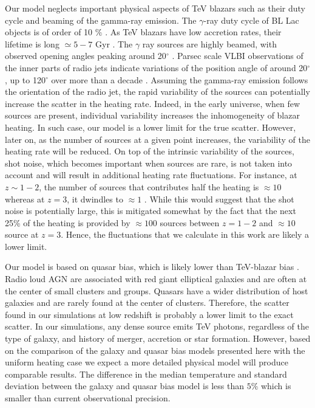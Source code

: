 \documentclass[numberedappendix]{emulateapj}
\newcommand\ALc[1]{{\color{red} \bf #1}} %
\begin{document}
{Our model neglects important physical aspects of TeV blazars such as their duty cycle and beaming of the gamma-ray emission. The $\gamma$-ray duty cycle of BL Lac objects is of order of 10 $\%$ \citep{1996ApJ...464..600S}. As TeV blazars have low accretion rates, their lifetime is long $\simeq 5-7$ Gyr \citep{2002ApJ...571..226C}. The $\gamma$ ray sources are highly beamed, with observed opening angles peaking around 20$^{\circ}$ \citep{2009A&A...507L..33P}. Parsec scale VLBI observations of the inner parts of radio jets indicate variations of the position angle of around 20$^{\circ}$, up to 120$^{\circ}$ over more than a decade \citep{2013AJ....146..120L}. Assuming the gamma-ray emission follows the orientation of the radio jet, the rapid variability of the sources can potentially increase the scatter in the heating rate. Indeed, in the early universe, when few sources are present,  individual variability increases the inhomogeneity of blazar heating. In such case, our model is a lower limit for the true scatter. However, later on, as the number of sources at a  given point increases, the variability of the heating rate will be reduced.    On top of the intrinsic  variability  of the sources, shot noise, which becomes important when sources are rare, is not taken into account and will result in additional heating rate fluctuations. For instance, at $z \sim 1-2$, the number of sources that contributes half the heating is $\approx 10$ whereas at $z = 3$, it dwindles to $\approx 1$ \citep{2012ApJ...752...23C}.   While this would suggest that the shot noise is potentially large, this is mitigated somewhat by the fact that the next 25\% of the heating is provided by $\approx 100$ sources between $z=1-2$ and $\approx 10$ source at $z=3$. 
Hence, the fluctuations that we calculate in this work are likely a lower limit.

Our model is based on quasar bias, which is likely lower than TeV-blazar bias \citep{2014arXiv1410.0358A}. Radio loud AGN are associated with red giant elliptical galaxies \citep{2007A&A...476..723H} and are often at the center of small clusters and groups. Quasars have a wider distribution of host galaxies and are rarely found at the center of clusters. Therefore, the scatter found in our simulations at low redshift is probably a lower limit to the exact scatter. In our simulations, any dense source emits TeV photons, regardless of the type of galaxy, and history of merger, accretion or star formation. However, based on the comparison of the galaxy and quasar bias models presented here with the uniform heating case we expect a more detailed physical model will produce comparable results. The difference in the median temperature and standard deviation between the galaxy and quasar bias model is less than $5\%$ which is smaller than current observational precision.
}
\end{document}
